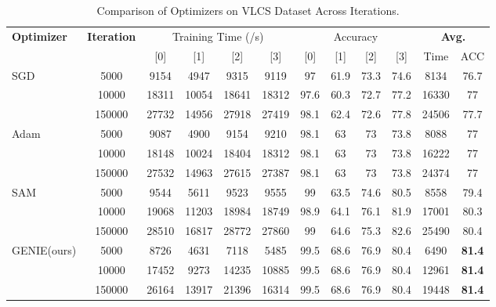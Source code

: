 \documentclass{article}
\theoremstyle{plain}
\theoremstyle{definition}
\theoremstyle{remark}
\begin{document}
\begin{table}[H]
\centering
\caption{Comparison of Optimizers on VLCS Dataset Across Iterations.}
\label{tab:vlcs_iter}
\vskip 0.15in
\begin{center}
\begin{small}
\begin{sc}
\begin{tabular}{l|c|cccc|cccc|c|c}
\toprule
\textbf{Optimizer}& \textbf{Iteration} & \multicolumn{4}{c}{Training Time (/s)} & \multicolumn{4}{c}{Accuracy} & \multicolumn{2}{c}{\textbf{Avg.}}\\
\cmidrule(lr){3-10}
 & & [0] & [1] & [2] & [3] & [0] & [1] & [2] & [3] & Time & ACC\\ 
\midrule
SGD & 5000 & 9154 & 4947 & 9315 & 9119 & 97 & 61.9 & 73.3 & 74.6 & 8134 & 76.7\\
    & 10000 & 18311 & 10054 & 18641 & 18312 & 97.6 & 60.3 & 72.7 & 77.2 & 16330 & 77\\
    & 150000 & 27732 & 14956 & 27918 & 27419 & 98.1 & 62.4 & 72.6 & 77.8 & 24506 & 77.7\\
\midrule
Adam & 5000 & 9087 & 4900 & 9154 & 9210 & 98.1 & 63 & 73 & 73.8 & 8088 & 77\\
     & 10000 & 18148 & 10024 & 18404 & 18312 & 98.1 & 63 & 73 & 73.8 & 16222 & 77\\
     & 150000 & 27532 & 14963 & 27615 & 27387 & 98.1 & 63 & 73 & 73.8 & 24374 & 77\\
\midrule
SAM & 5000 & 9544 & 5611 & 9523 & 9555 & 99 & 63.5 & 74.6 & 80.5 & 8558 & 79.4\\
    & 10000 & 19068 & 11203 & 18984 & 18749 & 98.9 & 64.1 & 76.1 & 81.9 & 17001 & 80.3\\
    & 150000 & 28510 & 16817 & 28772 & 27860 & 99 & 64.6 & 75.3 & 82.6 & 25490 & 80.4\\
\midrule
GENIE(ours) & 5000 & 8726 & 4631 & 7118 & 5485 & 99.5 & 68.6 & 76.9 & 80.4 & 6490 & \textbf{81.4}\\
      & 10000 & 17452 & 9273 & 14235 & 10885 & 99.5 & 68.6 & 76.9 & 80.4 & 12961 & \textbf{81.4}\\
      & 150000 & 26164 & 13917 & 21396 & 16314 & 99.5 & 68.6 & 76.9 & 80.4 & 19448 & \textbf{81.4}\\
\bottomrule
\end{tabular}
\end{sc}
\end{small}
\end{center}
\vskip -0.1in
\end{table}
\end{document}
